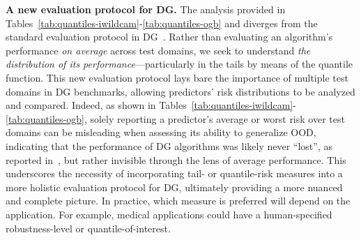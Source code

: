 \documentclass{article}
\begin{document}
%
\textbf{A new evaluation protocol for DG.}
The analysis provided in Tables~\ref{tab:quantiles-iwildcam}-\ref{tab:quantiles-ogb} and  diverges from the standard evaluation protocol in DG~\cite{gulrajani2020search,wilds2021}. 
%
Rather than evaluating an algorithm's performance \emph{on average} across test domains, we seek to understand \emph{the distribution of its performance}---particularly in the tails by means of the quantile function.  This new evaluation protocol lays bare the importance of multiple test domains in DG benchmarks, allowing predictors' risk distributions to be analyzed and compared.  Indeed, as shown in Tables~\ref{tab:quantiles-iwildcam}-\ref{tab:quantiles-ogb},
%
solely reporting a predictor's average or worst risk over test domains can be misleading when assessing its ability to generalize OOD, indicating that the performance of DG algorithms was likely never ``lost'', as reported in~\cite{gulrajani2020search}, but rather invisible through the lens of average performance. This underscores the necessity of incorporating tail- or quantile-risk measures into a more holistic evaluation protocol for DG, ultimately providing a more nuanced and complete picture. In practice, which measure is preferred will depend on the application. For example, medical applications could have a human-specified robustness-level or quantile-of-interest.
\end{document}
